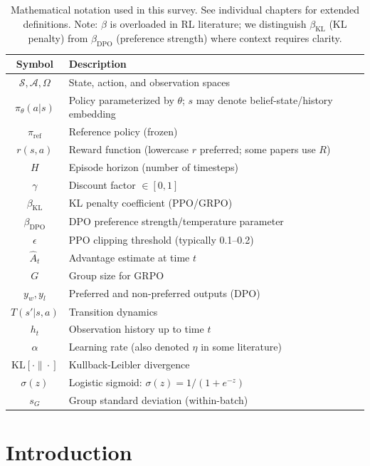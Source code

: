 \documentclass[12pt,a4paper]{report}
\theoremstyle{definition}
\begin{document}
\begin{table}[h]
\centering
\begin{tabular}{@{}cl@{}}
\toprule
\textbf{Symbol} & \textbf{Description} \\
\midrule
$\mathcal{S}, \mathcal{A}, \Omega$ & State, action, and observation spaces \\
$\pi_\theta(a|s)$ & Policy parameterized by $\theta$; $s$ may denote belief-state/history embedding \\
$\pi_{\text{ref}}$ & Reference policy (frozen) \\
$r(s,a)$ & Reward function (lowercase $r$ preferred; some papers use $R$) \\
$H$ & Episode horizon (number of timesteps) \\
$\gamma$ & Discount factor $\in [0,1]$ \\
$\beta_{\text{KL}}$ & KL penalty coefficient (PPO/GRPO) \\
$\beta_{\text{DPO}}$ & DPO preference strength/temperature parameter \\
$\epsilon$ & PPO clipping threshold (typically 0.1--0.2) \\
$\hat{A}_t$ & Advantage estimate at time $t$ \\
$G$ & Group size for GRPO \\
$y_w, y_l$ & Preferred and non-preferred outputs (DPO) \\
$T(s'|s,a)$ & Transition dynamics \\
$h_t$ & Observation history up to time $t$ \\
$\alpha$ & Learning rate (also denoted $\eta$ in some literature) \\
$\text{KL}[\cdot\|\cdot]$ & Kullback-Leibler divergence \\
$\sigma(z)$ & Logistic sigmoid: $\sigma(z) = 1/(1+e^{-z})$ \\
$s_G$ & Group standard deviation (within-batch) \\
\bottomrule
\end{tabular}
\caption{Mathematical notation used in this survey. See individual chapters for extended definitions. Note: $\beta$ is overloaded in RL literature; we distinguish $\beta_{\text{KL}}$ (KL penalty) from $\beta_{\text{DPO}}$ (preference strength) where context requires clarity.}
\label{tab:notation}
\end{table}

\clearpage
{}

\chapter{Introduction}
\label{ch:introduction}
\end{document}
